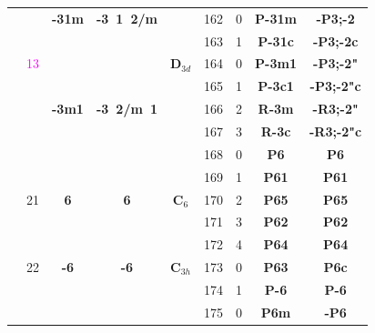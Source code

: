\documentclass{article}      %
\begin{document}
\begin{small}
\begin{longtable}[c]{|c|c|c|c|c|c|c|c|c|}
 & &\textbf{-31m} &\textbf{-3~1~2/m}  & &\textrm{162}  &\textrm{0} &\textbf{P-31m}       &\textbf{-P3;-2}\\\cline{6-9}        
 & & & & &\textrm{163}  &\textrm{1} &\textbf{P-31c}       &\textbf{-P3;-2c}\\\cline{3-4}\cline{6-9}       
 &\textrm{\textcolor{magenta}{13}}  & & &$\mathbf{D}_{3d}$ &\textrm{164}  &\textrm{0} &\textbf{P-3m1}       &\textbf{-P3;-2"}\\\cline{6-9}       
 & & & & &\textrm{165}  &\textrm{1} &\textbf{P-3c1}       &\textbf{-P3;-2"c}\\\cline{6-9} 
 & &\textbf{-3m1} &\textbf{-3~2/m~1} & &\textrm{166} & \textrm{2} &\textbf{R-3m}    &\textbf{-R3;-2"}\\\cline{6-9}
 & & & & &\textrm{167} & \textrm{3} &\textbf{R-3c}         &\textbf{-R3;-2"c}\\\hline   
          & & & & &\textrm{168}  &\textrm{0} &\textbf{P6}         &\textbf{P6}\\\cline{6-9}             
          & & & & &\textrm{169}  &\textrm{1} &\textbf{P61}         &\textbf{P61}\\\cline{6-9}           
          &\textrm{21} &\textbf{6} &\textbf{6}  &$\mathbf{C}_6$ &\textrm{170}  &\textrm{2} &\textbf{P65}         &\textbf{P65}\\\cline{6-9}           
	  & & & & &\textrm{171} &\textrm{3} &\textbf{P62}  &\textbf{P62}\\\cline{6-9}           
          & & & & &\textrm{172} &\textrm{4} &\textbf{P64}         &\textbf{P64}\\\cline{2-9}           
 & \textrm{22} &\textbf{-6} &\textbf{-6} &$\mathbf{C}_{3h}$ &\textrm{173}  &\textrm{0} &\textbf{P63}         &\textbf{P6c}\\\cline{6-9}           
          & & & & &\textrm{174}  &\textrm{1} &\textbf{P-6}         &\textbf{P-6}\\\cline{2-9}           
          & & & & &\textrm{175}  &\textrm{0} &\textbf{P6m}         &\textbf{-P6}\\\cline{6-9}           

\end{longtable}
\end{small}
\end{document}
